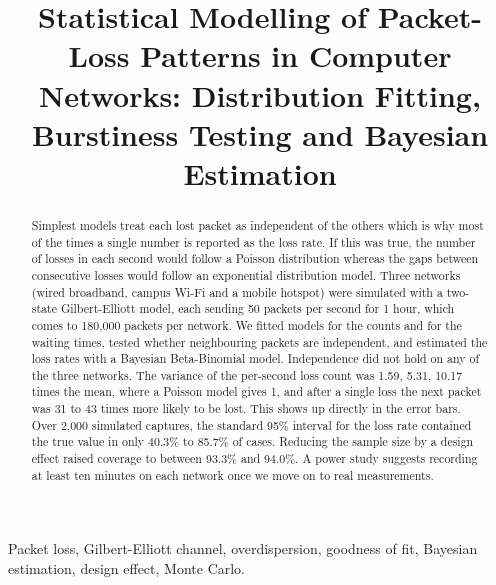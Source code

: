 \documentclass[conference]{IEEEtran}
\begin{document}
\title{Statistical Modelling of Packet-Loss Patterns in Computer Networks: Distribution Fitting, Burstiness Testing and Bayesian Estimation}

\author{
\and
{}
\and
{}}

\maketitle

\begin{abstract}
Simplest models treat each lost packet as independent of the others which is why most of the times a single number is reported as the loss rate. If this was true, the number of losses in each second would follow a Poisson distribution whereas the gaps between consecutive losses would follow an exponential distribution model. Three networks (wired broadband, campus Wi-Fi and a mobile hotspot) were simulated with a two-state Gilbert-Elliott model, each sending 50 packets per second for 1 hour, which comes to 180{,}000 packets per network. We fitted models for the counts and for the waiting times, tested whether neighbouring packets are independent, and estimated the loss rates with a Bayesian Beta-Binomial model. Independence did not hold on any of the three networks. The variance of the per-second loss count was 1.59, 5.31, 10.17 times the mean, where a Poisson model gives 1, and after a single loss the next packet was 31 to 43 times more likely to be lost. This shows up directly in the error bars. Over 2{,}000 simulated captures, the standard 95\% interval for the loss rate contained the true value in only 40.3\% to 85.7\% of cases. Reducing the sample size by a design effect raised coverage to between 93.3\% and 94.0\%. A power study suggests recording at least ten minutes on each network once we move on to real measurements.
\end{abstract}

\begin{IEEEkeywords}
Packet loss, Gilbert-Elliott channel, overdispersion, goodness of fit, Bayesian estimation, design effect, Monte Carlo.
\end{IEEEkeywords}
\end{document}
